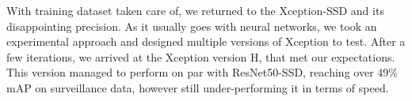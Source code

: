 With training dataset taken care of, we returned to the Xception-SSD and its disappointing precision. As it usually goes with neural networks, we took an experimental approach and designed multiple versions of Xception to test. After a few iterations, we arrived at the Xception version H, that met our expectations. This version managed to perform on par with ResNet50-SSD, reaching over 49\% mAP on surveillance data, however still under-performing it in terms of speed. 








